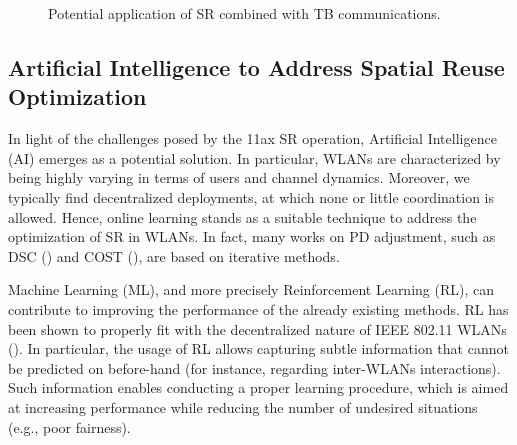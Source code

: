 \documentclass[preprint,12pt]{elsarticle}
\begin{document}
	\begin{figure}[ht!]
		\centering		
		\caption{Potential application of SR combined with TB communications.}		\label{fig:sr_and_tb}
	\end{figure}
	
	\subsection{Artificial Intelligence to Address Spatial Reuse Optimization}
	
	In light of the challenges posed by the 11ax SR operation, Artificial Intelligence (AI) emerges as a potential solution. In particular, WLANs are characterized by being highly varying in terms of users and channel dynamics. Moreover, we typically find decentralized deployments, at which none or little coordination is allowed. Hence, online learning stands as a suitable technique to address the optimization of SR in WLANs. In fact, many works on PD adjustment, such as DSC (\citealp{smith2015dynamic}) and COST (\citealp{selinis2018control}), are based on iterative methods. 
	
	Machine Learning (ML), and more precisely Reinforcement Learning (RL), can contribute to improving the performance of the already existing methods. RL has been shown to properly fit with the decentralized nature of IEEE 802.11 WLANs (\citealp{wilhelmi2019collaborative, wilhelmi2019potential}). In particular, the usage of RL allows capturing subtle information that cannot be predicted on before-hand (for instance, regarding inter-WLANs interactions). Such information enables conducting a proper learning procedure, which is aimed at increasing performance while reducing the number of undesired situations (e.g., poor fairness).
	
\end{document}
